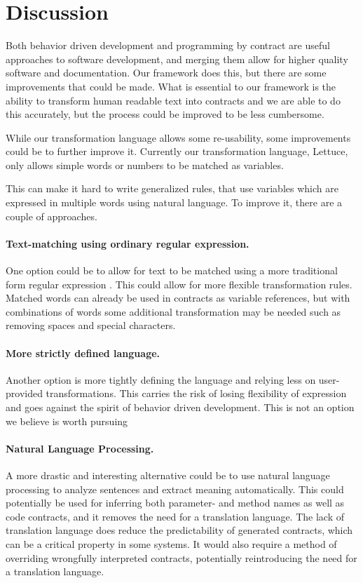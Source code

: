 \section{Discussion}
Both behavior driven development and programming by contract are useful approaches to software development, and merging them allow for higher quality software and documentation.
Our framework does this, but there are some improvements that could be made.
What is essential to our framework is the ability to transform human readable text into contracts and we are able to do this accurately, but the process could be improved to be less cumbersome.

While our transformation language allows some re-usability, some improvements could be to further improve it.
Currently our transformation language, Lettuce, only allows simple words or numbers to be matched as variables.

This can make it hard to write generalized rules, that use variables which are expressed in multiple words using natural language.
To improve it, there are a couple of approaches.

\paragraph{Text-matching using ordinary regular expression.}
One option could be to allow for text to be matched using a more traditional form regular expression \cite{thompson1968programming}.
This could allow for more flexible transformation rules.
Matched words can already be used in contracts as variable references, but with combinations of words some additional transformation may be needed such as removing spaces and special characters.

\paragraph{More strictly defined language.}
Another option is more tightly defining the language and relying less on user-provided transformations.
This carries the risk of losing flexibility of expression and goes against the spirit of behavior driven development.
This is not an option we believe is worth pursuing

\paragraph{Natural Language Processing.}
A more drastic and interesting alternative could be to use natural language processing \cite{jurafsky2002speech} to analyze sentences and extract meaning automatically.
This could potentially be used for inferring both parameter- and method names as well as code contracts, and it removes the need for a translation language.
The lack of translation language does reduce the predictability of generated contracts, which can be a critical property in some systems.
It would also require a method of overriding wrongfully interpreted contracts, potentially reintroducing the need for a translation language.

